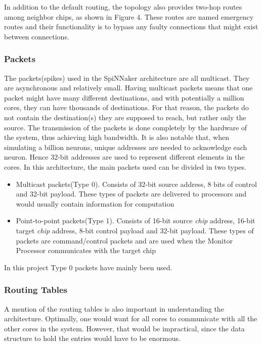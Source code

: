 \documentclass[12pt,twosided]{article}
\begin{document}
In addition to the default routing, the topology also provides two-hop routes among neighbor chips, as shown in Figure 4. These routes are named emergency routes and their functionality is to bypass any faulty connections that might exist between connections\cite{navaridas2009understanding}\cite{plana2007gals}.

\subsubsection{Packets}
The packets(spikes) used in the SpiNNaker architecture are all multicast. They are asynchronous and relatively small. Having multicast packets means that one packet might have many different destinations, and with potentially a million cores, they can have thousands of destinations. For that reason, the packets do not contain the destination(s) they are supposed to reach, but rather only the source. The transmission of the packets is done completely by the hardware of the system, thus achieving high bandwidth\cite{spinnweb}\cite{navaridas2009understanding}. It is also notable that, when simulating a billion neurons, unique addresses are needed to acknowledge each neuron. Hence 32-bit addresses are used to represent different elements in the cores. In this architecture, the main packets used can be divided in two types.
\begin{itemize}
\item Multicast packets(Type 0). Consists of 32-bit source address, 8 bits of control and 32-bit payload. These types of packets are delivered to processors and would usually contain information for computation
\item Point-to-point packets(Type 1). Consists of 16-bit source \emph{chip} address, 16-bit target \emph{chip} address, 8-bit control payload and 32-bit payload. These types of packets are command/control packets and are used when the Monitor Processor communicates with the target chip\cite{docfile}
\end{itemize}

In this project Type 0 packets have mainly been used.
\subsubsection{Routing Tables}
A mention of the routing tables is also important in understanding the architecture. Optimally, one would want for all cores to communicate with all the other cores in the system. However, that would be impractical, since the data structure to hold the entries would have to be enormous.
\end{document}

